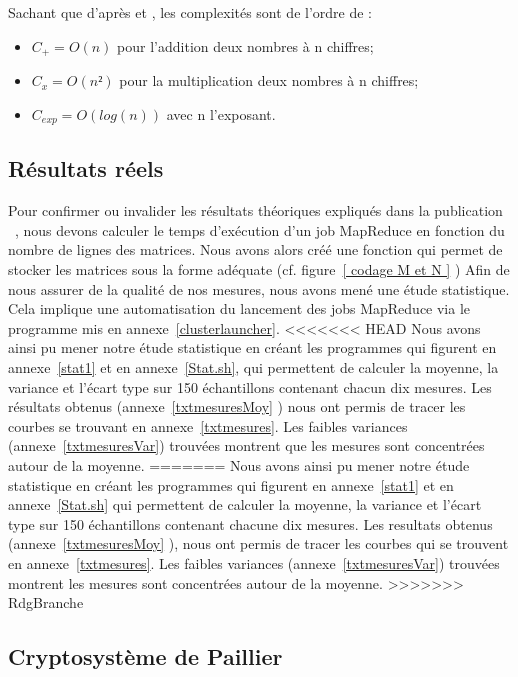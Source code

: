 \bigskip
Sachant que d'après \cite{complex-operations} et \cite{FAHIMA}, les complexités sont de l'ordre de :
\begin{itemize}
\item $C_{+} = O(n)$ pour l'addition deux nombres à n chiffres;
\item $C_{x} = O(n²)$ pour la multiplication  deux nombres à n chiffres;
\item $C_{exp} = O(log(n))$ avec n l'exposant. 
\end{itemize}

\subsection{Résultats réels}

Pour confirmer ou invalider les résultats théoriques expliqués dans la publication ~\cite{publi-tuteurs}, nous devons calculer le temps d'exécution d'un job MapReduce en fonction du nombre de lignes des matrices.
Nous avons alors créé une fonction qui permet de stocker les matrices sous la forme adéquate (cf. figure~\ref{ codage M et N } ) 
Afin de nous assurer de la qualité de nos mesures, nous avons mené une étude statistique. 
Cela implique une automatisation du lancement des jobs MapReduce via le programme mis en annexe~\ref{clusterlauncher}.
<<<<<<< HEAD
Nous avons ainsi pu mener notre étude statistique en créant les programmes qui figurent en annexe~\ref{stat1} et en annexe~\ref{Stat.sh}, qui permettent de calculer la moyenne, la variance et l'écart type sur 150 échantillons contenant chacun dix mesures.
Les résultats obtenus (annexe~\ref{txtmesuresMoy} ) nous ont permis de tracer les courbes se trouvant en annexe~\ref{txtmesures}.
Les faibles variances (annexe~\ref{txtmesuresVar}) trouvées montrent que les mesures sont concentrées autour de la moyenne. 
=======
Nous avons ainsi pu mener notre étude statistique en créant les programmes qui figurent en annexe~\ref{stat1} et en annexe~\ref{Stat.sh} qui permettent de calculer la moyenne, la variance et l'écart type sur 150 échantillons contenant chacune dix mesures.
Les resultats obtenus (annexe~\ref{txtmesuresMoy} ), nous ont permis de tracer les courbes qui se trouvent en annexe~\ref{txtmesures}.
Les faibles variances (annexe~\ref{txtmesuresVar}) trouvées montrent les mesures sont concentrées autour de la moyenne. 
>>>>>>> RdgBranche
 
\subsection{Cryptosystème de Paillier}

